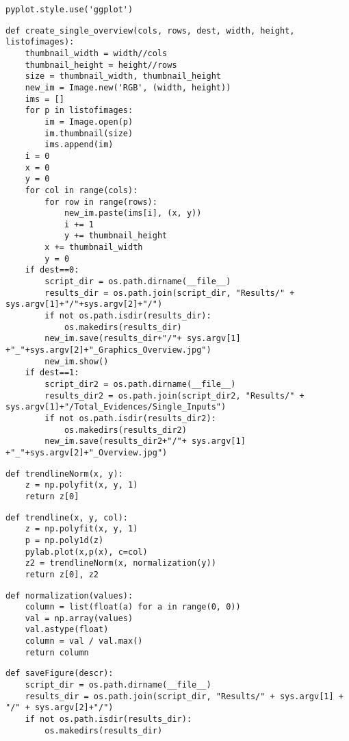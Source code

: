 \begin{lstlisting}
pyplot.style.use('ggplot')
\end{lstlisting}

\begin{lstlisting}
def create_single_overview(cols, rows, dest, width, height, listofimages):
    thumbnail_width = width//cols
    thumbnail_height = height//rows
    size = thumbnail_width, thumbnail_height
    new_im = Image.new('RGB', (width, height))
    ims = []
    for p in listofimages:
        im = Image.open(p)
        im.thumbnail(size)
        ims.append(im)
    i = 0
    x = 0
    y = 0
    for col in range(cols):
        for row in range(rows):
            new_im.paste(ims[i], (x, y))
            i += 1
            y += thumbnail_height
        x += thumbnail_width
        y = 0
    if dest==0:
    	script_dir = os.path.dirname(__file__)
    	results_dir = os.path.join(script_dir, "Results/" + sys.argv[1]+"/"+sys.argv[2]+"/")
    	if not os.path.isdir(results_dir):
    		os.makedirs(results_dir)
        new_im.save(results_dir+"/"+ sys.argv[1] +"_"+sys.argv[2]+"_Graphics_Overview.jpg")
        new_im.show()
    if dest==1:
    	script_dir2 = os.path.dirname(__file__)
    	results_dir2 = os.path.join(script_dir2, "Results/" + sys.argv[1]+"/Total_Evidences/Single_Inputs")
    	if not os.path.isdir(results_dir2):
    		os.makedirs(results_dir2)
        new_im.save(results_dir2+"/"+ sys.argv[1] +"_"+sys.argv[2]+"_Overview.jpg")
\end{lstlisting}


\begin{lstlisting}
def trendlineNorm(x, y):
	z = np.polyfit(x, y, 1)
	return z[0]
\end{lstlisting}

\begin{lstlisting}
def trendline(x, y, col):
	z = np.polyfit(x, y, 1)
	p = np.poly1d(z)
	pylab.plot(x,p(x), c=col)
	z2 = trendlineNorm(x, normalization(y))
	return z[0], z2
\end{lstlisting}

\begin{lstlisting}
def normalization(values):
	column = list(float(a) for a in range(0, 0))
	val = np.array(values)
	val.astype(float)
	column = val / val.max()
	return column
\end{lstlisting}

\begin{lstlisting}
def saveFigure(descr):
    script_dir = os.path.dirname(__file__)
    results_dir = os.path.join(script_dir, "Results/" + sys.argv[1] + "/" + sys.argv[2]+"/")
    if not os.path.isdir(results_dir):
        os.makedirs(results_dir)
\end{lstlisting}

